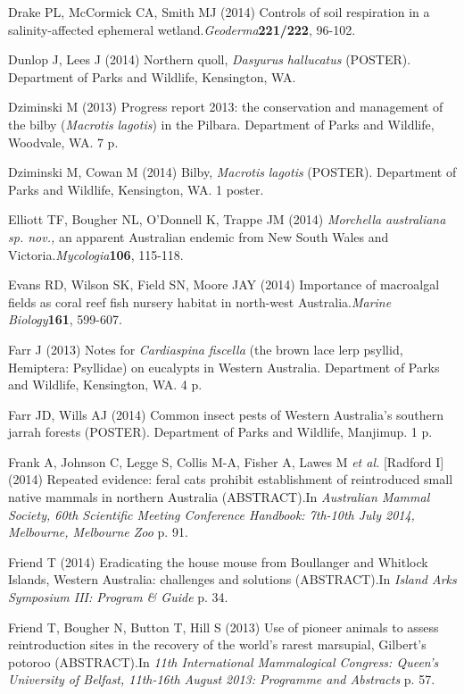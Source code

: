\documentclass[version=last, paper=a4, DIV=18, usenames, dvipsnames]{scrartcl}
\begin{document}
Drake PL, McCormick CA, Smith MJ (2014) Controls of soil respiration in a salinity-affected ephemeral wetland.\emph{Geoderma}\textbf{221/222}, 96-102.


Dunlop J, Lees J (2014) Northern quoll, \emph{Dasyurus} \emph{hallucatus} (POSTER). Department of Parks and Wildlife, Kensington, WA.


Dziminski M (2013) Progress report 2013: the conservation and management of the bilby (\emph{Macrotis} \emph{lagotis}) in the Pilbara. Department of Parks and Wildlife, Woodvale, WA. 7 p.


Dziminski M, Cowan M (2014) Bilby, \emph{Macrotis} \emph{lagotis} (POSTER). Department of Parks and Wildlife, Kensington, WA. 1 poster.


Elliott TF, Bougher NL, O'Donnell K, Trappe JM (2014) \emph{Morchella} \emph{australiana} \emph{sp. nov.,} an apparent Australian endemic from New South Wales and Victoria.\emph{Mycologia}\textbf{106}, 115-118.


Evans RD, Wilson SK, Field SN, Moore JAY (2014) Importance of macroalgal fields as coral reef fish nursery habitat in north-west Australia.\emph{Marine Biology}\textbf{161}, 599-607.


Farr J (2013) Notes for \emph{Cardiaspina} \emph{fiscella} (the brown lace lerp psyllid, Hemiptera: Psyllidae) on eucalypts in Western Australia. Department of Parks and Wildlife, Kensington, WA. 4 p.


Farr JD, Wills AJ (2014) Common insect pests of Western Australia's southern jarrah forests (POSTER). Department of Parks and Wildlife, Manjimup. 1 p.


Frank A, Johnson C, Legge S, Collis M-A, Fisher A, Lawes M \emph{et al.} [Radford I] (2014) Repeated evidence: feral cats prohibit establishment of reintroduced small native mammals in northern Australia (ABSTRACT).In \emph{Australian Mammal Society, 60th Scientific Meeting Conference Handbook: 7th-10th July 2014, Melbourne, Melbourne Zoo} p. 91.


Friend T (2014) Eradicating the house mouse from Boullanger and Whitlock Islands, Western Australia: challenges and solutions (ABSTRACT).In \emph{Island Arks Symposium III: Program \& Guide} p. 34.


Friend T, Bougher N, Button T, Hill S (2013) Use of pioneer animals to assess reintroduction sites in the recovery of the world's rarest marsupial, Gilbert's potoroo (ABSTRACT).In \emph{11th International Mammalogical Congress: Queen's University of Belfast, 11th-16th August 2013: Programme and Abstracts} p. 57.
\end{document}

